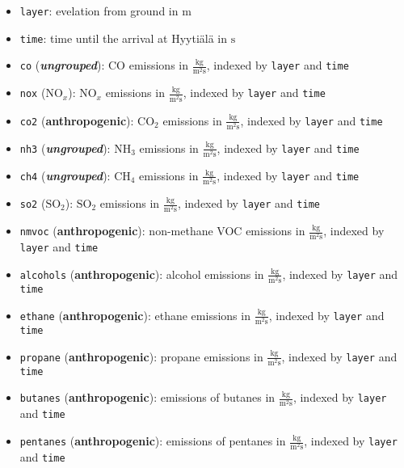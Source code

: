 \begin{itemize}
    \item \texttt{layer}: evelation from ground in $\text{m}$
    \item \texttt{time}: time until the arrival at Hyyti\"al\"a in $\text{s}$
    \item \texttt{co} (\textit{\textbf{ungrouped}}): $\text{CO}$ emissions in $\frac{\text{kg}}{\text{m}^2 \text{s}}$, indexed by \texttt{layer} and \texttt{time}
    \item \texttt{nox} (\textbf{$\text{NO}_{x}$}): $\text{NO}_{x}$ emissions in $\frac{\text{kg}}{\text{m}^2 \text{s}}$, indexed by \texttt{layer} and \texttt{time}
    \item \texttt{co2} (\textbf{anthropogenic}): $\text{CO}_{2}$ emissions in $\frac{\text{kg}}{\text{m}^2 \text{s}}$, indexed by \texttt{layer} and \texttt{time}
    \item \texttt{nh3} (\textit{\textbf{ungrouped}}): $\text{NH}_{3}$ emissions in $\frac{\text{kg}}{\text{m}^2 \text{s}}$, indexed by \texttt{layer} and \texttt{time}
    \item \texttt{ch4} (\textit{\textbf{ungrouped}}): $\text{CH}_{4}$ emissions in $\frac{\text{kg}}{\text{m}^2 \text{s}}$, indexed by \texttt{layer} and \texttt{time}
    \item \texttt{so2} (\textbf{$\text{SO}_{2}$}): $\text{SO}_{2}$ emissions in $\frac{\text{kg}}{\text{m}^2 \text{s}}$, indexed by \texttt{layer} and \texttt{time}
    \item \texttt{nmvoc} (\textbf{anthropogenic}): non-methane VOC emissions in $\frac{\text{kg}}{\text{m}^2 \text{s}}$, indexed by \texttt{layer} and \texttt{time}
    \item \texttt{alcohols} (\textbf{anthropogenic}): alcohol emissions in $\frac{\text{kg}}{\text{m}^2 \text{s}}$, indexed by \texttt{layer} and \texttt{time}
    \item \texttt{ethane} (\textbf{anthropogenic}): ethane emissions in $\frac{\text{kg}}{\text{m}^2 \text{s}}$, indexed by \texttt{layer} and \texttt{time}
    \item \texttt{propane} (\textbf{anthropogenic}): propane emissions in $\frac{\text{kg}}{\text{m}^2 \text{s}}$, indexed by \texttt{layer} and \texttt{time}
    \item \texttt{butanes} (\textbf{anthropogenic}): emissions of butanes in $\frac{\text{kg}}{\text{m}^2 \text{s}}$, indexed by \texttt{layer} and \texttt{time}
    \item \texttt{pentanes} (\textbf{anthropogenic}): emissions of pentanes in $\frac{\text{kg}}{\text{m}^2 \text{s}}$, indexed by \texttt{layer} and \texttt{time}

\end{itemize}
